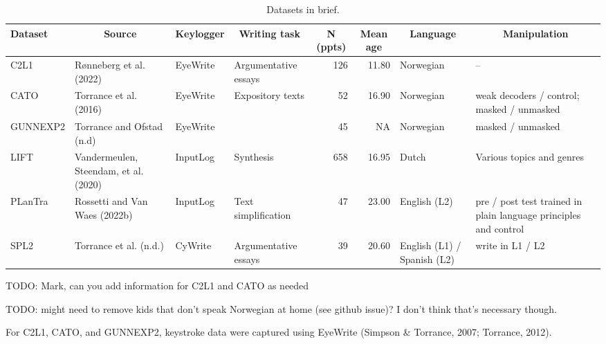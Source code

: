 \documentclass[
  english,
  man,floatsintext]{apa7}
\begin{document}
\begin{landscape}

\begin{table}[tbp]

\begin{center}
\begin{threeparttable}

\caption{\label{tab:datasets}Datasets in brief.}

\footnotesize{

\begin{tabular}{llllrrp{2cm}p{3cm}}
\toprule
Dataset & \multicolumn{1}{c}{Source} & \multicolumn{1}{c}{Keylogger} & \multicolumn{1}{c}{Writing task} & \multicolumn{1}{c}{N (ppts)} & \multicolumn{1}{c}{Mean age} & \multicolumn{1}{c}{Language} & \multicolumn{1}{c}{Manipulation}\\
\midrule
C2L1 & Rønneberg et al. (2022) & EyeWrite & Argumentative essays & 126 & 11.80 & Norwegian & --\\
CATO & Torrance et al. (2016) & EyeWrite & Expository texts & 52 & 16.90 & Norwegian & weak decoders / control; masked / unmasked\\
GUNNEXP2 & Torrance and Ofstad (n.d) & EyeWrite &  & 45 & NA & Norwegian & masked / unmasked\\
LIFT & Vandermeulen, Steendam, et al. (2020) & InputLog & Synthesis & 658 & 16.95 & Dutch & Various topics and genres\\
PLanTra & Rossetti and Van Waes (2022b) & InputLog & Text simplification & 47 & 23.00 & English (L2) & pre / post test trained in plain language principles and control\\
SPL2 & Torrance et al. (n.d.) & CyWrite & Argumentative essays & 39 & 20.60 & English (L1) / Spanish (L2) & write in L1 / L2\\
\bottomrule
\end{tabular}

}

\end{threeparttable}
\end{center}

\end{table}
\end{landscape}

TODO: Mark, can you add information for C2L1 and CATO as needed

TODO: might need to remove kids that don't speak Norwegian at home (see github issue)? I don't think that's necessary though.

For C2L1, CATO, and GUNNEXP2, keystroke data were captured using EyeWrite (Simpson \& Torrance, 2007; Torrance, 2012).
\end{document}
